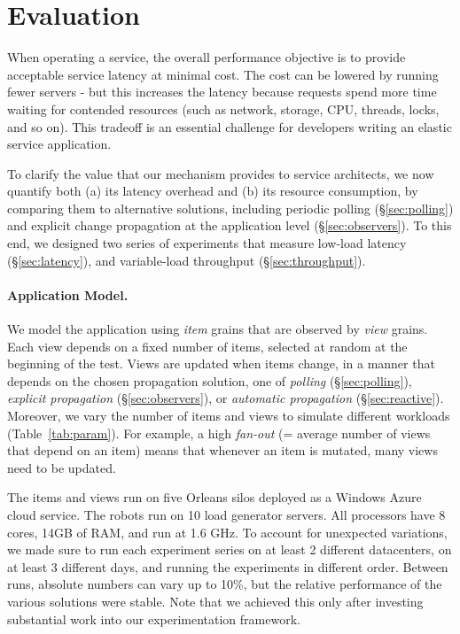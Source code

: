 \section{Evaluation}

When operating a service, the overall performance objective is to provide acceptable service latency at minimal cost. The cost can be lowered by running fewer servers - but this increases the latency because requests spend more time waiting for contended resources (such as network, storage, CPU, threads, locks, and so on). This tradeoff is an essential challenge for developers writing an elastic service application. 

To clarify the value that our mechanism provides to service architects, we now quantify both (a) its latency overhead and (b) its resource consumption, by comparing them to alternative solutions, including periodic polling (\S\ref{sec:polling}) and explicit change propagation at the application level (\S\ref{sec:observers}). To this end, we designed two series of experiments that measure low-load latency (\S\ref{sec:latency}), and variable-load throughput (\S\ref{sec:throughput}).

\paragraph{Application Model.}  
We model the application using  \emph{item} grains that are observed by \emph{view} grains. Each view depends on a fixed number of items, selected at random at the beginning of the test. Views are updated when items change, in a manner that depends on the chosen propagation solution, one of \emph{polling} (\S\ref{sec:polling}), \emph{explicit propagation} (\S\ref{sec:observers}), or \emph{automatic propagation} (\S\ref{sec:reactive}). Moreover, we vary the number of items and views to simulate different workloads (Table~\ref{tab:param}).  For example, a high \emph{fan-out} (= average number of views that depend on an item) means that whenever an item is mutated, many views need to be updated.  

 
The items and views run on five Orleans silos deployed as a Windows Azure cloud service. The robots run on 10 load generator servers. All processors have 8 cores, 14GB of RAM, and run at 1.6 GHz. To account for unexpected variations, we made sure to run each experiment series on at least 2 different datacenters, on at least 3 different days, and running the experiments in different order. Between runs, absolute numbers can vary up to 10\%, but the relative performance of the various solutions were stable. Note that we achieved this only after investing substantial work into our experimentation framework. 


